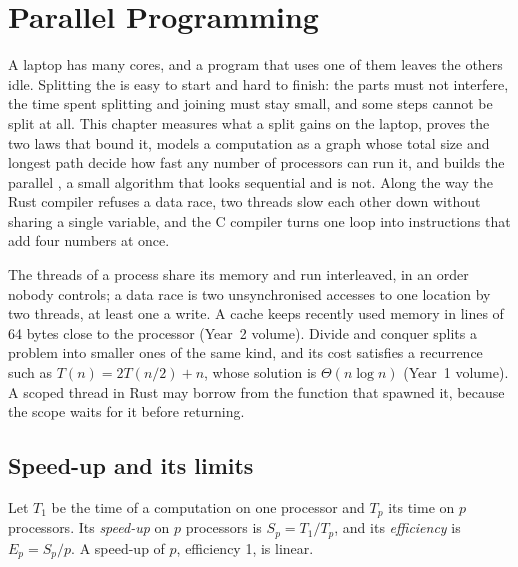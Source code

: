 \chapter{Parallel Programming}\label{ch:b3:parallel-programming}

A laptop has many cores, and a program that uses one of them leaves the others idle. Splitting the  is easy to start and hard to finish: the parts must not interfere, the time spent splitting and joining must stay small, and some steps cannot be split at all. This chapter measures what a split gains on the laptop, proves the two laws that bound it, models a computation as a graph whose total size and longest path decide how fast any number of processors can run it, and builds the parallel , a small algorithm that looks sequential and is not. Along the way the Rust compiler refuses a data race, two threads slow each other down without sharing a single variable, and the C compiler turns one loop into instructions that add four numbers at once.

\begin{recall}
The threads of a process share its memory and run interleaved, in an order nobody controls; a data race is two unsynchronised accesses to one location by two threads, at least one a write. A cache keeps recently used memory in lines of 64 bytes close to the processor (Year~2 volume). Divide and conquer splits a problem into smaller ones of the same kind, and its cost satisfies a recurrence such as $T(n) = 2T(n/2) + n$, whose solution is $\Theta(n \log n)$ (Year~1 volume). A scoped thread in Rust may borrow from the function that spawned it, because the scope waits for it before returning.
\end{recall}

\section{Speed-up and its limits}\label{sec:b3:parallel-programming:speedup}

\begin{definition}\label{def:b3:parallel-programming:speedup}
Let $T_1$ be the time of a computation on one processor and $T_p$ its time on $p$ processors. Its \emph{speed-up} on $p$ processors is $S_p = T_1 / T_p$, and its \emph{efficiency} is $E_p = S_p / p$. A speed-up of $p$, efficiency 1, is linear.
\end{definition}

